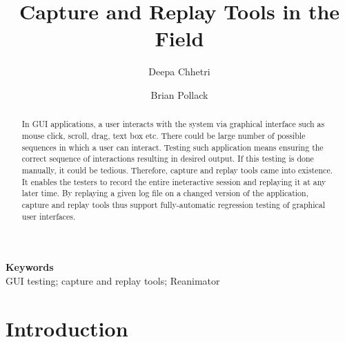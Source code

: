 \documentclass[12pt,journal]{IEEEtran}
\providecommand{\keywords}[1]{\textbf{Keywords} #1}
\begin{document}
\title{Capture and Replay Tools in the Field}
\author[1]{Deepa Chhetri}
\author[1]{Brian Pollack}
\maketitle

\begin{abstract}
In GUI applications, a user interacts with the system via graphical interface such as mouse click, scroll, drag, text box etc. There could be large number of possible sequences in which a user can interact. Testing such application means ensuring the correct sequence of interactions resulting in desired output. If this testing is done manually, it could be tedious. Therefore, capture and replay tools came into existence. It  enables the testers to record the entire ineteractive session and replaying it at any later time. By replaying a given log file on a changed version of the application, capture and replay tools thus support fully-automatic regression testing of graphical user interfaces.
\end{abstract}

\keywords\\{GUI testing; capture and replay tools; Reanimator}

\section{Introduction}
\end{document}
